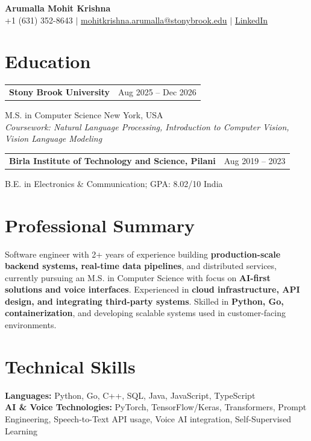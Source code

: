 \documentclass[letterpaper,10pt]{article}
\makeatletter
\newcommand{\entry}[2]{%
  \noindent
  \begin{tabularx}{\linewidth}
    {@{}>{\raggedright\arraybackslash}X@{\hspace{6pt}}r@{}}
    \textbf{#1} & #2
  \end{tabularx}\par
}
\makeatother
\begin{document}
\begin{center}
    {\LARGE\bfseries Arumalla Mohit Krishna}\\[3pt]
    +1 (631) 352-8643 $|$
    \href{mailto:mohitkrishna.arumalla@stonybrook.edu}
    {mohitkrishna.arumalla@stonybrook.edu} $|$
    \href{https://linkedin.com/in/mohit-krishna-arumalla}
    {LinkedIn}
\end{center}
\vspace{-8pt}

\section{Education}

\entry
  {\textbf{Stony Brook University}}
  {Aug 2025 -- Dec 2026}

M.S. in Computer Science \hfill New York, USA\\
\textit{
Coursework: Natural Language Processing,
Introduction to Computer Vision, Vision Language Modeling
}
\vspace{3pt}

\entry
  {\textbf{Birla Institute of Technology and Science, Pilani}}
  {Aug 2019 -- 2023}

B.E. in Electronics \& Communication; GPA: 8.02/10 \hfill India
\section{Professional Summary}

Software engineer with 2+ years of experience building \textbf{production-scale backend systems, real-time data pipelines}, and distributed services, currently pursuing an M.S. in Computer Science with focus on \textbf{AI-first solutions and voice interfaces}. Experienced in \textbf{cloud infrastructure, API design, and integrating third-party systems}. Skilled in \textbf{Python, Go, containerization}, and developing scalable systems used in customer-facing environments.

\section{Technical Skills}

\textbf{Languages:}
Python, Go, C++, SQL, Java, JavaScript, TypeScript\\

\textbf{AI \& Voice Technologies:}
PyTorch, TensorFlow/Keras, Transformers, Prompt Engineering,
Speech-to-Text API usage, Voice AI integration, Self-Supervised Learning\\
\end{document}

